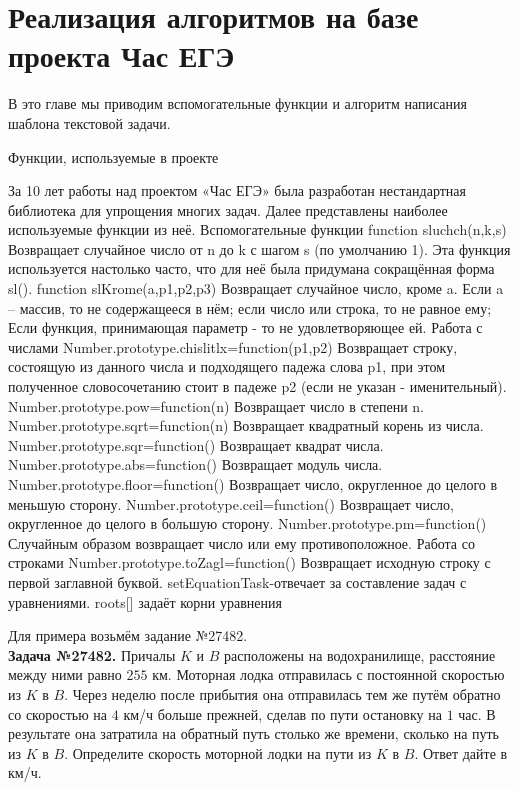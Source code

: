 
\section{Реализация алгоритмов на базе проекта Час ЕГЭ}
В это главе мы приводим вспомогательные функции и алгоритм написания шаблона текстовой задачи.

Функции, используемые в проекте

За 10 лет работы над проектом «Час ЕГЭ» была разработан нестандартная библиотека для упрощения многих задач. Далее представлены наиболее используемые функции из неё.
Вспомогательные функции
function sluchch(n,k,s) Возвращает случайное число от n до k с шагом s (по умолчанию 1). Эта функция используется настолько часто, что для неё была придумана сокращённая форма sl(). function slKrome(a,p1,p2,p3) Возвращает случайное число, кроме a. Если a – массив, то не содержащееся в нём; если число или строка, то не равное ему; Если функция, принимающая параметр - то не удовлетворяющее ей.
Работа с числами 
Number.prototype.chislitlx=function(p1,p2) Возвращает строку, состоящую из данного числа и подходящего падежа слова p1, при этом полученное словосочетанию стоит в падеже p2 (если не указан - именительный).
Number.prototype.pow=function(n) Возвращает число в степени n. 
Number.prototype.sqrt=function(n) Возвращает квадратный корень из числа. 
Number.prototype.sqr=function() Возвращает квадрат числа. 
Number.prototype.abs=function() Возвращает модуль числа. 
Number.prototype.floor=function() Возвращает число, округленное до целого в меньшую сторону. 
Number.prototype.ceil=function() Возвращает число, округленное до целого в большую сторону. 
Number.prototype.pm=function() Случайным образом возвращает число или ему противоположное. 
Работа со строками 
Number.prototype.toZagl=function() Возвращает исходную строку с первой заглавной буквой.
setEquationTask-отвечает за составление задач с уравнениями.
roots[] задаёт корни уравнения

Для примера возьмём задание №27482.
\\
\textbf{Задача №27482.}
Причалы $K$ и $B$ расположены на водохранилище, расстояние между ними равно $255$ км. Моторная лодка отправилась с постоянной скоростью из $K$ в $B$. Через неделю после прибытия она отправилась тем же путём обратно со скоростью на $4$ км/ч больше прежней, сделав по пути остановку на $1$ час. В результате она затратила на обратный путь столько же времени, сколько на путь из $K$ в $B$. Определите скорость моторной лодки на пути из $K$ в $B$. Ответ дайте в км/ч.\\ 

